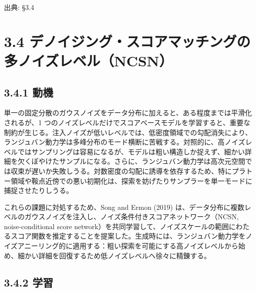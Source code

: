 

{\color{gray}\footnotesize 出典: §3.4\par}
\vspace{0.2em}
\section*{3.4 デノイジング・スコアマッチングの多ノイズレベル（NCSN）}



\subsection*{3.4.1 動機}


単一の固定分散のガウスノイズをデータ分布に加えると、ある程度までは平滑化されるが、1 つのノイズレベルだけでスコアベースモデルを学習すると、重要な制約が生じる。注入ノイズが低いレベルでは、低密度領域での勾配消失により、ランジュバン動力学は多峰分布のモード横断に苦戦する。対照的に、高ノイズレベルではサンプリングは容易になるが、モデルは粗い構造しか捉えず、細かい詳細を欠くぼやけたサンプルになる。さらに、ランジュバン動力学は高次元空間では収束が遅いか失敗しうる。対数密度の勾配に誘導を依存するため、特にプラトー領域や鞍点近傍での悪い初期化は、探索を妨げたりサンプラーを単一モードに捕捉させたりしうる。



これらの課題に対処するため、Song and Ermon (2019) は、データ分布に複数レベルのガウスノイズを注入し、ノイズ条件付きスコアネットワーク（NCSN, noise-conditional score network）を共同学習して、ノイズスケールの範囲にわたるスコア関数を推定することを提案した。生成時には、ランジュバン動力学をノイズアニーリング的に適用する：粗い探索を可能にする高ノイズレベルから始め、細かい詳細を回復するため低ノイズレベルへ徐々に精錬する。



\subsection*{3.4.2 学習}


